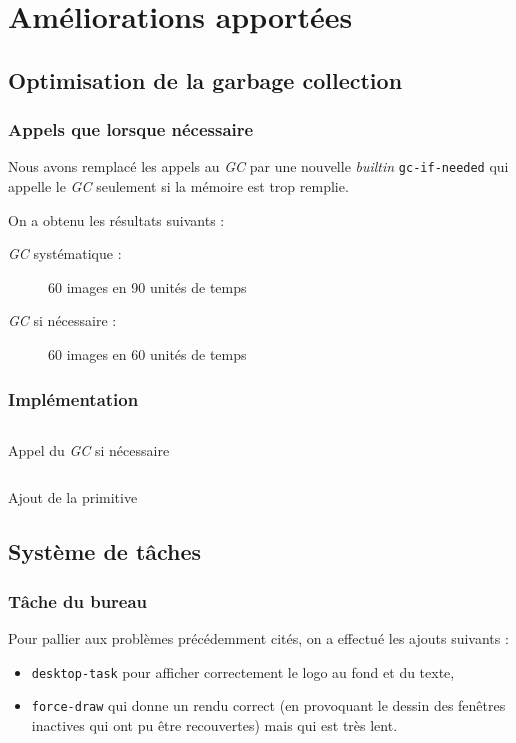 \documentclass[c, 11pt, handout, xcolor=table]{beamer}
\newcommand{\source}[5]{
  \begin{table}[H]
    \centering
    \inputminted[frame=lines,linenos,style=colorful,fontfamily=tt,breaklines,autogobble,firstline=#3,firstnumber=#3,lastline=#4,label={#2[#3--#4]}]{#1}{../interim/sledge/#2}
    \captionsetup{name=Listing,labelformat=listing,labelsep=endash}
    \caption{#5}
  \end{table}
  }
\newcommand{\sourceC}[4]{\source{C}{#1}{#2}{#3}{#4}}
\newcommand{\sourceLisp}[4]{\source{Lisp}{os/#1}{#2}{#3}{#4}}
\newcommand{\codeLisp}[1]{\texttt{#1}}
\newcommand{\foreign}[1]{\emph{#1}}
\begin{document}
\section{Améliorations apportées}

\subsection{Optimisation de la garbage collection}

\begin{frame}
 \frametitle{Appels que lorsque nécessaire}
 
 Nous avons remplacé les appels au \foreign{GC} par une nouvelle \foreign{builtin} \codeLisp{gc-if-needed} qui appelle le \foreign{GC} seulement si la mémoire est trop remplie.

 On a obtenu les résultats suivants :
 \begin{description}
  \item [\foreign{GC} systématique :] 60 images en 90 unités de temps
  \item [\foreign{GC} si nécessaire :] 60 images en 60 unités de temps
 \end{description}
\end{frame}

\begin{frame}
 \frametitle{Implémentation}
 
 \tiny
 \sourceC{alloc.c}{186}{191}{Appel du \foreign{GC} si nécessaire}
 \begin{table}[H]
  \centering
  \inputminted[frame=lines,linenos,style=colorful,fontfamily=tt,breaklines,autogobble,firstline=1638,firstnumber=1638,lastline=1646,label={compiler\_new[1638--1646]}]{C}{../interim/sledge/compiler_new.c}
  \captionsetup{name=Listing,labelformat=listing,labelsep=endash}
  \caption{Ajout de la primitive}
 \end{table}
\end{frame}

 
\subsection{Système de tâches}

\begin{frame}
 \frametitle{Tâche du bureau}
 
  Pour pallier aux problèmes précédemment cités, on a effectué les ajouts suivants :
 \begin{itemize}
  \item \codeLisp{desktop-task} pour afficher correctement le logo au fond et du texte,
  \item \codeLisp{force-draw} qui donne un rendu correct (en provoquant le dessin des fenêtres inactives qui ont pu être recouvertes) mais qui est très lent.
 \end{itemize}

\end{frame}
\end{document}
